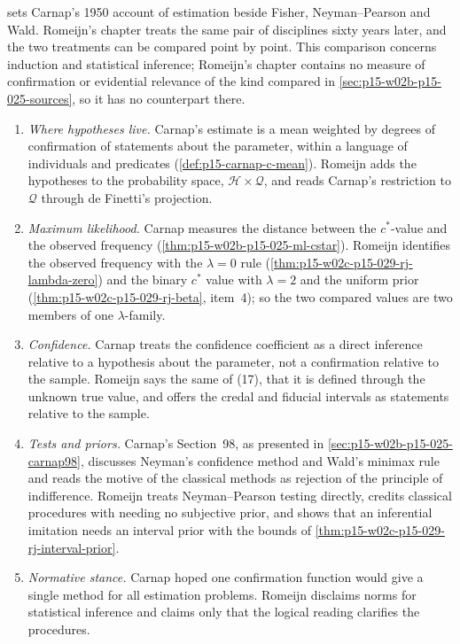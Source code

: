  sets Carnap's 1950 account of
estimation beside Fisher, Neyman--Pearson and Wald. Romeijn's chapter
treats the same pair of disciplines sixty years later, and the two
treatments can be compared point by point. This comparison concerns
induction and statistical inference; Romeijn's chapter contains no
measure of confirmation or evidential relevance of the kind compared in
\cref{sec:p15-w02b-p15-025-sources}, so it has no counterpart there.
\begin{enumerate}
\item \emph{Where hypotheses live.} Carnap's estimate is a mean weighted
  by degrees of confirmation of statements about the parameter, within a
  language of individuals and predicates
  (\cref{def:p15-carnap-c-mean}). Romeijn adds the hypotheses to the
  probability space, \(\mathcal H\times\mathcal Q\), and reads Carnap's
  restriction to \(\mathcal Q\) through de Finetti's projection.
\item \emph{Maximum likelihood.} Carnap measures the distance between
  the \(c^*\)-value and the observed frequency
  (\cref{thm:p15-w02b-p15-025-ml-cstar}). Romeijn identifies the
  observed frequency with the \(\lambda=0\) rule
  (\cref{thm:p15-w02c-p15-029-rj-lambda-zero}) and the binary \(c^*\)
  value with \(\lambda=2\) and the uniform prior
  (\cref{thm:p15-w02c-p15-029-rj-beta}, item~4); so the two compared
  values are two members of one \(\lambda\)-family.
\item \emph{Confidence.} Carnap treats the confidence coefficient as a
  direct inference relative to a hypothesis about the parameter, not a
  confirmation relative to the sample. Romeijn says the same of (17),
  that it is defined through the unknown true value, and offers the
  credal and fiducial intervals as statements relative to the sample.
\item \emph{Tests and priors.} Carnap's Section~98, as presented in
  \cref{sec:p15-w02b-p15-025-carnap98}, discusses Neyman's confidence
  method and Wald's minimax rule and reads the motive of the classical
  methods as rejection of the principle of indifference. Romeijn treats
  Neyman--Pearson testing directly, credits classical procedures with
  needing no subjective prior, and shows that an inferential imitation
  needs an interval prior with the bounds of
  \cref{thm:p15-w02c-p15-029-rj-interval-prior}.
\item \emph{Normative stance.} Carnap hoped one confirmation function
  would give a single method for all estimation problems. Romeijn
  disclaims norms for statistical inference and claims only that the
  logical reading clarifies the procedures.
\end{enumerate}


